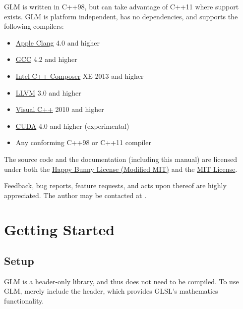 \documentclass{scrartcl}
\numberwithin{figure}{subsection}
\begin{document}
GLM is written in C++98, but can take advantage of C++11 where support exists. GLM is platform independent, has no dependencies, and supports the following compilers:

\begin{itemize}
  \item \href{https://developer.apple.com/Library/mac/documentation/CompilerTools/Conceptual/LLVMCompilerOverview/index.html}{Apple Clang} 4.0 and higher
  \item \href{http://gcc.gnu.org/}{GCC} 4.2 and higher
  \item \href{https://software.intel.com/en-us/intel-compilers}{Intel C++ Composer} XE 2013 and higher
  \item \href{http://llvm.org/}{LLVM} 3.0 and higher
  \item \href{http://www.visualstudio.com/}{Visual C++} 2010 and higher
  \item \href{https://developer.nvidia.com/about-cuda}{CUDA} 4.0 and higher (experimental)
  \item Any conforming C++98 or C++11 compiler
\end{itemize}

The source code and the documentation (including this manual) are licensed under both the \hyperlink{happybunny}{Happy Bunny License (Modified MIT)} and the \hyperlink{mit}{MIT License}.

Feedback, bug reports, feature requests, and acts upon thereof are highly appreciated.  The author may be contacted at .

\newpage{}

\section{Getting Started}
\subsection{Setup}

GLM is a header-only library, and thus does not need to be compiled.  To use GLM, merely include the  header, which provides GLSL's mathematics functionality.
\end{document}
